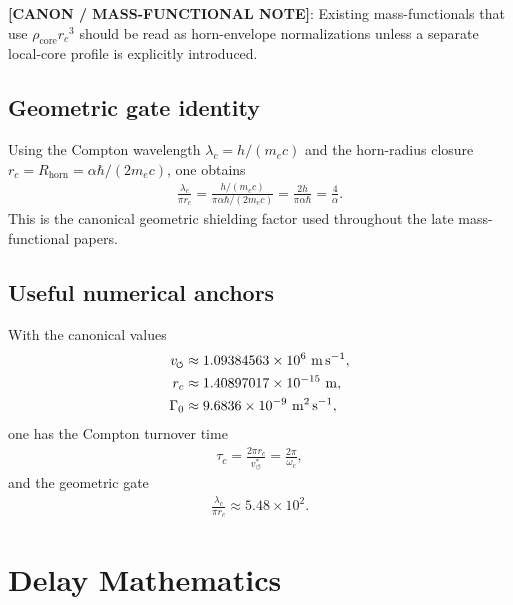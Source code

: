 \documentclass[11pt]{article}
\theoremstyle{definition}
\theoremstyle{plain}
\theoremstyle{remark}
\newcommand{\swirlarrow}{\mathchoice{\mkern-2mu\scriptstyle\boldsymbol{\circlearrowleft}}{\mkern-2mu\scriptstyle\boldsymbol{\circlearrowleft}}{\mkern-2mu\scriptscriptstyle\boldsymbol{\circlearrowleft}}{\mkern-2mu\scriptscriptstyle\boldsymbol{\circlearrowleft}}}
\newcommand{\rc}{{r_c}}
\newcommand{\vchar}{v_{\!\boldsymbol{\circlearrowleft}}^{\ast}}
\begin{document}
            \textbf{[CANON / MASS-FUNCTIONAL NOTE]}: Existing mass-functionals that use $\rho_{\mathrm{core}}\rc^3$ should be read as horn-envelope normalizations unless a separate local-core profile is explicitly introduced.

        \subsection{Geometric gate identity}
            Using the Compton wavelength $\lambda_c = h/(m_e c)$ and the horn-radius closure $r_c=R_{\mathrm{horn}} = \alpha\hbar/(2m_e c)$, one obtains
            \begin{align}
                \frac{\lambda_c}{\pi r_c}
                =
                \frac{h/(m_e c)}{\pi \alpha \hbar /(2m_e c)}
                =
                \frac{2h}{\pi \alpha \hbar}
                =
                \frac{4}{\alpha}.
            \end{align}
            This is the canonical geometric shielding factor used throughout the late mass-functional papers.

        \subsection{Useful numerical anchors}
            With the canonical values
            \begin{align}
                v_{\swirlarrow} &\approx 1.09384563\times 10^6\ \mathrm{m\,s^{-1}}, \\
                r_c &\approx 1.40897017\times 10^{-15}\ \mathrm{m}, \\
                \Gamma_0 &\approx 9.6836\times 10^{-9}\ \mathrm{m^2\,s^{-1}},
            \end{align}
            one has the Compton turnover time
            \begin{align}
                \tau_c = \frac{2\pi \rc}{\vchar} = \frac{2\pi}{\omega_c},
            \end{align}
            and the geometric gate
            \begin{align}
                \frac{\lambda_c}{\pi \rc} \approx 5.48\times 10^2.
            \end{align}

    \section{Delay Mathematics}
        \label{sec:appendix_delay}
\end{document}
